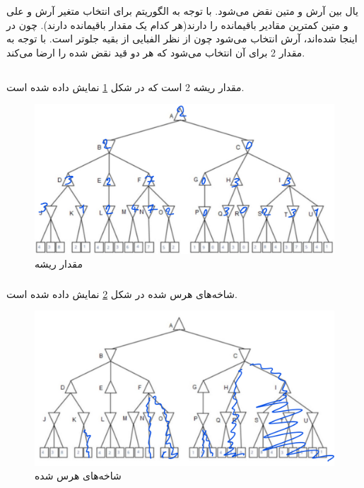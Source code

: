 \documentclass{university}
\begin{document}
\subsubsection{}
یال بین آرش و متین نقض می‌شود. 
با توجه به الگوریتم 
برای انتخاب متغیر آرش و علی و متین کمترین مقادیر باقیمانده را دارند(هر کدام یک مقدار باقیمانده دارند).
چون در اینجا 
شده‌اند، آرش انتخاب می‌شود چون از نظر الفبایی از بقیه جلوتر است. با توجه به 
مقدار 2 برای آن انتخاب می‌شود که هر دو قید نقض شده را ارضا می‌کند. 

\subsection{}
\subsubsection{}
مقدار ریشه 2 است که در شکل 
\ref{fig:41}
نمایش داده شده است.
\begin{figure}
    \centering
    \includegraphics[width=\textwidth]{assets/4-1.png}
    \caption{مقدار ریشه}
    \label{fig:41}
\end{figure}

\subsubsection{}
شاخه‌های هرس شده در شکل 
\ref{fig:42}
نمایش داده شده است.
\begin{figure}
    \centering
    \includegraphics[width=\textwidth]{assets/4-2.png}
    \caption{شاخه‌های هرس شده}
    \label{fig:42}
\end{figure}
\end{document}
